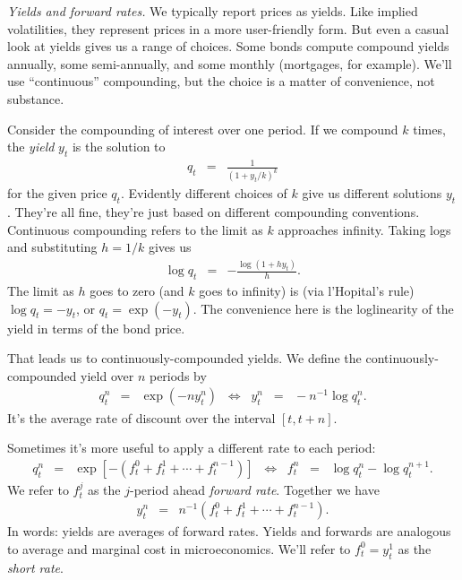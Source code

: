 \documentclass[11pt]{article}
\begin{document}
{\it Yields and forward rates.\/}
We typically report prices as yields.
Like implied volatilities, they represent prices in a more user-friendly form.
But even a casual look at yields gives us a range of choices.
Some bonds compute compound yields annually, some semi-annually,
and some monthly (mortgages, for example).
We'll use ``continuous'' compounding, but the choice is a matter of convenience, not substance.

Consider the compounding of interest over one period.
If we compound $k$ times, the {\it yield\/} $y_t$ is the solution to
\begin{eqnarray*}
    q_t &=& \frac{1} {(1+ y_t/k)^k}
\end{eqnarray*}
for the given price $q_t$.
Evidently different choices of $k$ give us different solutions $y_t$.
They're all fine, they're just based on different compounding conventions.
Continuous compounding refers to the limit as $k$ approaches infinity.
Taking logs and substituting $ h = 1/k$ gives us
\begin{eqnarray*}
    \log q_t &=& - \frac {\log (1+ h y_t)} {h} .
\end{eqnarray*}
The limit as $h$ goes to zero (and $k$ goes to infinity) is (via l'Hopital's rule)
$ \log q_t = - y_t $, or $q_t = \exp(-y_t)$.
The convenience here is the loglinearity of the yield in terms of the bond price.

That leads us to continuously-compounded yields.
We define the continuously-compounded yield over $n$ periods by
\begin{eqnarray}
    q^n_t &=&  \exp(- n y^n_t)
        \;\;\Leftrightarrow\;\;
        y^n_t \;\;=\;\; - n^{-1} \log q^n_t .
        \label{eq:yields}
\end{eqnarray}
It's the average rate of discount over the interval $[t, t+n]$.


Sometimes it's more useful to apply a different
rate to each period:
\begin{eqnarray}
    q^n_t &=&  \exp[- (f^0_t + f^1_t + \cdots + f^{n-1}_t)]
        \;\;\Leftrightarrow\;\;
        f^n_t \;\;=\;\;  \log q^n_t - \log q^{n+1}_t .
        \label{eq:forwards}
\end{eqnarray}
We refer to $f^j_t$ as the $j$-period ahead {\it forward rate\/}.
Together we have
\begin{eqnarray*}
    y^n_t &=&  n^{-1} \left( f^0_t + f^1_t + \cdots + f^{n-1}_t \right).
\end{eqnarray*}
In words:  yields are averages of forward rates.
Yields and forwards are analogous to average and marginal cost in microeconomics.
We'll refer to $f^0_t = y^1_t$ as the {\it short rate\/}.
\end{document}
